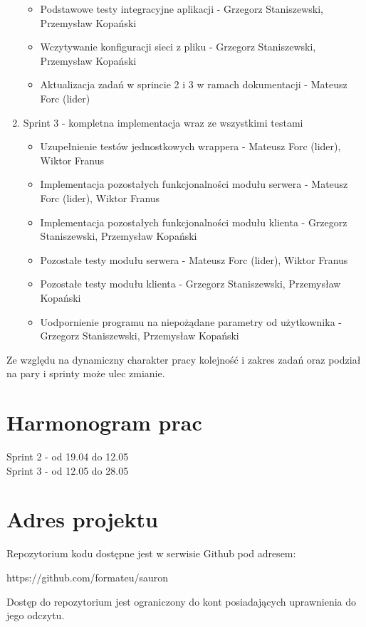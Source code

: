 \documentclass[a4paper,11pt]{article}
\begin{document}
\begin{enumerate}
\begin{itemize}
\item Podstawowe testy integracyjne aplikacji - Grzegorz Staniszewski, Przemysław Kopański
\item Wczytywanie konfiguracji sieci z pliku - Grzegorz Staniszewski, Przemysław Kopański
\item Aktualizacja zadań w sprincie 2 i 3 w ramach dokumentacji - Mateusz Forc (lider)
\end{itemize}
\item Sprint 3 - kompletna implementacja wraz ze wszystkimi testami
\begin{itemize}
\item Uzupełnienie testów jednostkowych wrappera - Mateusz Forc (lider), Wiktor Franus
\item Implementacja pozostałych funkcjonalności modułu serwera - Mateusz Forc (lider), Wiktor Franus
\item Implementacja pozostałych funkcjonalności modułu klienta
      - Grzegorz Staniszewski, Przemysław Kopański
\item Pozostałe testy modułu serwera - Mateusz Forc (lider), Wiktor Franus
\item Pozostałe testy modułu klienta - Grzegorz Staniszewski, Przemysław Kopański
\item Uodpornienie programu na niepożądane parametry od użytkownika
      - Grzegorz Staniszewski, Przemysław Kopański
\end{itemize}
\end{enumerate}
Ze względu na dynamiczny charakter pracy kolejność i zakres zadań oraz podział na pary i sprinty
może ulec zmianie.

\section{Harmonogram prac}
Sprint 2 - od 19.04 do 12.05 \\
Sprint 3 - od 12.05 do 28.05 \\

\section{Adres projektu}
Repozytorium kodu dostępne jest w serwisie Github pod adresem:
\begin{center}https://github.com/formateu/sauron \end{center}
Dostęp do repozytorium jest ograniczony do kont posiadających uprawnienia do jego odczytu.
\end{document}
